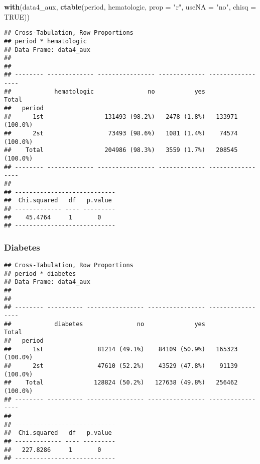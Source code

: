 \documentclass[
]{article}
\newenvironment{Shaded}{\begin{snugshade}}{\end{snugshade}}
\newcommand{\DataTypeTok}[1]{\textcolor[rgb]{0.13,0.29,0.53}{#1}}
\newcommand{\KeywordTok}[1]{\textcolor[rgb]{0.13,0.29,0.53}{\textbf{#1}}}
\newcommand{\NormalTok}[1]{#1}
\newcommand{\OperatorTok}[1]{\textcolor[rgb]{0.81,0.36,0.00}{\textbf{#1}}}
\newcommand{\OtherTok}[1]{\textcolor[rgb]{0.56,0.35,0.01}{#1}}
\newcommand{\StringTok}[1]{\textcolor[rgb]{0.31,0.60,0.02}{#1}}
\begin{document}
\begin{Shaded}
\begin{Highlighting}[]
\KeywordTok{with}\NormalTok{(data4_aux, }\KeywordTok{ctable}\NormalTok{(period, hematologic, }\DataTypeTok{prop =} \StringTok{"r"}\NormalTok{, }\DataTypeTok{useNA =} \StringTok{"no"}\NormalTok{, }\DataTypeTok{chisq =} \OtherTok{TRUE}\NormalTok{))}
\end{Highlighting}
\end{Shaded}

\begin{verbatim}
## Cross-Tabulation, Row Proportions  
## period * hematologic  
## Data Frame: data4_aux  
## 
## 
## -------- ------------- ---------------- ------------- -----------------
##            hematologic               no           yes             Total
##   period                                                               
##      1st                 131493 (98.2%)   2478 (1.8%)   133971 (100.0%)
##      2st                  73493 (98.6%)   1081 (1.4%)    74574 (100.0%)
##    Total                 204986 (98.3%)   3559 (1.7%)   208545 (100.0%)
## -------- ------------- ---------------- ------------- -----------------
## 
## ----------------------------
##  Chi.squared   df   p.value 
## ------------- ---- ---------
##    45.4764     1       0    
## ----------------------------
\end{verbatim}

\hypertarget{diabetes-1}{%
\subsubsection{Diabetes}\label{diabetes-1}}

\begin{Shaded}
\end{Shaded}

\begin{verbatim}
## Cross-Tabulation, Row Proportions  
## period * diabetes  
## Data Frame: data4_aux  
## 
## 
## -------- ---------- ---------------- ---------------- -----------------
##            diabetes               no              yes             Total
##   period                                                               
##      1st               81214 (49.1%)    84109 (50.9%)   165323 (100.0%)
##      2st               47610 (52.2%)    43529 (47.8%)    91139 (100.0%)
##    Total              128824 (50.2%)   127638 (49.8%)   256462 (100.0%)
## -------- ---------- ---------------- ---------------- -----------------
## 
## ----------------------------
##  Chi.squared   df   p.value 
## ------------- ---- ---------
##   227.8286     1       0    
## ----------------------------
\end{verbatim}
\end{document}
